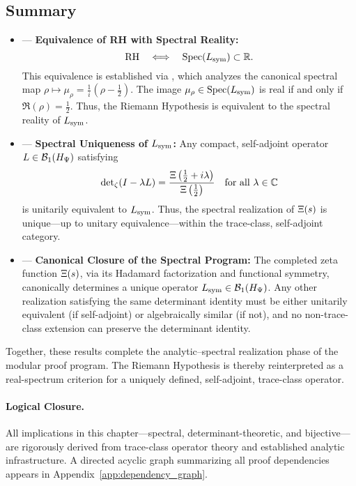 \subsection*{Summary}

\begin{itemize}
  \item {} — \textbf{Equivalence of RH with Spectral Reality:}
  \[
  \mathrm{RH} \quad \Longleftrightarrow \quad \operatorname{Spec}(L_{\mathrm{sym}}) \subset \mathbb{R}.
  \]
  This equivalence is established via , which analyzes the canonical spectral map \( \rho \mapsto \mu_\rho = \tfrac{1}{i}(\rho - \tfrac{1}{2}) \). The image \( \mu_\rho \in \operatorname{Spec}(L_{\mathrm{sym}}) \) is real if and only if \( \Re(\rho) = \tfrac{1}{2} \). Thus, the Riemann Hypothesis is equivalent to the spectral reality of \( L_{\mathrm{sym}} \).

  \item {} — \textbf{Spectral Uniqueness of \( L_{\mathrm{sym}} \):}
  Any compact, self-adjoint operator \( L \in \mathcal{B}_1(H_{\Psi}) \) satisfying
  \[
  \det\nolimits_\zeta(I - \lambda L)
  = \frac{\Xi\left(\tfrac{1}{2} + i\lambda\right)}{\Xi\left(\tfrac{1}{2}\right)} \quad \text{for all } \lambda \in \mathbb{C}
  \]
  is unitarily equivalent to \( L_{\mathrm{sym}} \). Thus, the spectral realization of \( \Xi(s) \) is unique—up to unitary equivalence—within the trace-class, self-adjoint category.

  \item {} — \textbf{Canonical Closure of the Spectral Program:}
  The completed zeta function \( \Xi(s) \), via its Hadamard factorization and functional symmetry, canonically determines a unique operator \( L_{\mathrm{sym}} \in \mathcal{B}_1(H_{\Psi}) \). Any other realization satisfying the same determinant identity must be either unitarily equivalent (if self-adjoint) or algebraically similar (if not), and no non-trace-class extension can preserve the determinant identity.
\end{itemize}

\medskip

Together, these results complete the analytic–spectral realization phase of the modular proof program. The Riemann Hypothesis is thereby reinterpreted as a real-spectrum criterion for a uniquely defined, self-adjoint, trace-class operator.

\paragraph{Logical Closure.}
All implications in this chapter—spectral, determinant-theoretic, and bijective—are rigorously derived from trace-class operator theory and established analytic infrastructure. A directed acyclic graph summarizing all proof dependencies appears in Appendix~\ref{app:dependency_graph}.

